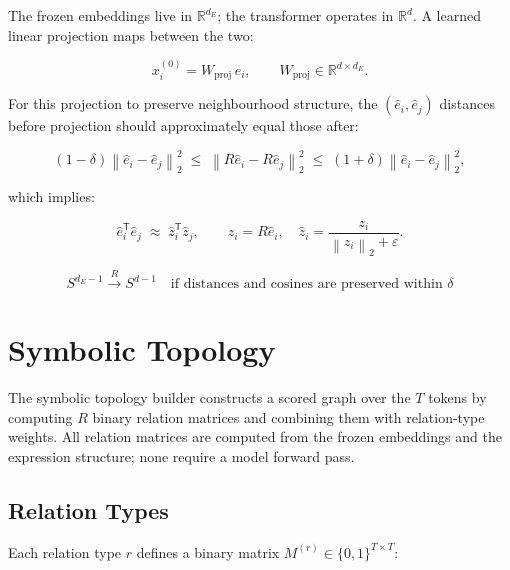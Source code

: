 \documentclass[11pt]{article}
\newcommand{\R}{\mathbb{R}}
\newcommand{\eps}{\varepsilon}
\newcommand{\norm}[1]{\left\lVert #1 \right\rVert}
\begin{document}
The frozen embeddings live in $\R^{d_E}$; the transformer operates
in $\R^{d}$.  A learned linear projection maps between the two:

\[
x_i^{(0)} = W_{\text{proj}}\, e_i,
\qquad
W_{\text{proj}} \in \R^{d \times d_E}.
\]

For this projection to preserve neighbourhood structure, the
$(\hat{e}_i, \hat{e}_j)$ distances before projection should
approximately equal those after:

\[
(1-\delta)\norm{\hat{e}_i - \hat{e}_j}_2^2
\;\leq\;
\norm{R\hat{e}_i - R\hat{e}_j}_2^2
\;\leq\;
(1+\delta)\norm{\hat{e}_i - \hat{e}_j}_2^2,
\]

which implies:

\[
\hat{e}_i^{\mathsf{T}}\hat{e}_j
\;\approx\;
\hat{z}_i^{\mathsf{T}}\hat{z}_j,
\qquad
z_i = R\hat{e}_i,\quad
\hat{z}_i = \frac{z_i}{\norm{z_i}_2 + \eps}.
\]

\[
\boxed{
  S^{d_E-1}
  \xrightarrow{\;R\;}
  S^{d-1}
  \quad\text{if distances and cosines are preserved within }\delta
}
\]

\section*{Symbolic Topology}

The symbolic topology builder constructs a scored graph over the $T$ tokens
by computing $R$ binary relation matrices and combining them with
relation-type weights.  All relation matrices are computed from
the frozen embeddings and the expression structure; none require
a model forward pass.

\subsection*{Relation Types}

Each relation type $r$ defines a binary matrix $M^{(r)} \in \{0,1\}^{T\times T}$:
\end{document}
